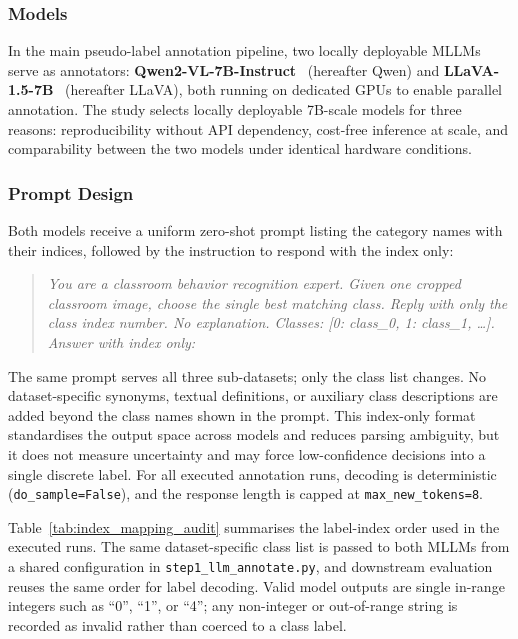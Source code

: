 \documentclass[10pt,letterpaper]{article}
\begin{document}
\subsubsection*{Models}

In the main pseudo-label annotation pipeline, two locally deployable
MLLMs serve as annotators:
\textbf{Qwen2-VL-7B-Instruct}~\cite{bai2023qwen} (hereafter Qwen)
and \textbf{LLaVA-1.5-7B}~\cite{liu2023llava} (hereafter LLaVA),
both running on dedicated GPUs to enable parallel annotation.
The study selects locally deployable 7B-scale models for three reasons:
reproducibility without API dependency, cost-free inference at scale,
and comparability between the two models under identical hardware
conditions.

\subsubsection*{Prompt Design}

Both models receive a uniform zero-shot prompt listing the category
names with their indices, followed by the instruction to respond with
the index only:

\begin{quote}
\textit{You are a classroom behavior recognition expert.
Given one cropped classroom image, choose the single best matching
class. Reply with only the class index number. No explanation.
Classes: [0: class\_0, 1: class\_1, \ldots]. Answer with index only:}
\end{quote}

The same prompt serves all three sub-datasets; only the class list
changes.
No dataset-specific synonyms, textual definitions, or auxiliary class
descriptions are added beyond the class names shown in the prompt.
This index-only format standardises the output space across models and
reduces parsing ambiguity, but it does not measure uncertainty and may
force low-confidence decisions into a single discrete label.
For all executed annotation runs, decoding is deterministic
(\texttt{do\_sample=False}), and the response length is capped at
\texttt{max\_new\_tokens=8}.

Table~\ref{tab:index_mapping_audit} summarises the label-index order
used in the executed runs. The same dataset-specific class list is
passed to both MLLMs from a shared configuration in
\texttt{step1\_llm\_annotate.py}, and downstream evaluation reuses the
same order for label decoding. Valid model outputs are single in-range
integers such as ``0'', ``1'', or ``4''; any non-integer or out-of-range
string is recorded as invalid rather than coerced to a class label.
\end{document}
